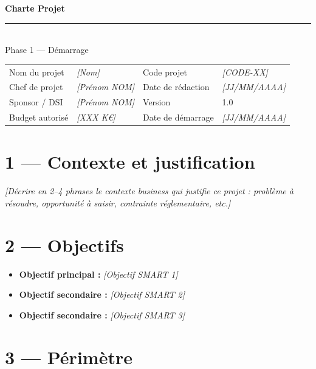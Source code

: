 \documentclass[11pt,a4paper,oneside]{report}
\begin{document}
\small

\begin{center}
{\LARGE\bfseries\color{cnNavy} Charte Projet}\\[4pt]
\textcolor{cnOrange}{\rule{10cm}{1pt}}\\[4pt]
{\large\color{cnSlate} Phase 1 --- Démarrage}
\end{center}

\vspace{6pt}
\renewcommand{\arraystretch}{1.4}
\begin{tabularx}{\textwidth}{L{4cm} Y L{4cm} Y}
\toprule
{} &  &  &  \\
\midrule
Nom du projet      & \textit{[Nom]}         & Code projet    & \textit{[CODE-XX]} \\
Chef de projet     & \textit{[Prénom NOM]}  & Date de rédaction & \textit{[JJ/MM/AAAA]} \\
Sponsor / DSI      & \textit{[Prénom NOM]}  & Version        & 1.0 \\
Budget autorisé    & \textit{[XXX K€]} & Date de démarrage & \textit{[JJ/MM/AAAA]} \\
\bottomrule
\end{tabularx}

\section*{1 --- Contexte et justification}

\textit{[Décrire en 2--4 phrases le contexte business qui justifie ce projet : problème à résoudre, opportunité à saisir, contrainte réglementaire, etc.]}

\section*{2 --- Objectifs}

\begin{itemize}
  \item \textbf{Objectif principal :} \textit{[Objectif SMART 1]}
  \item \textbf{Objectif secondaire :} \textit{[Objectif SMART 2]}
  \item \textbf{Objectif secondaire :} \textit{[Objectif SMART 3]}
\end{itemize}

\section*{3 --- Périmètre}
\end{document}
